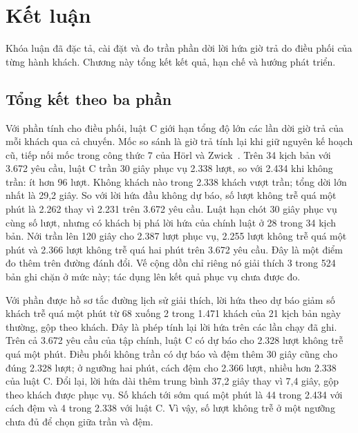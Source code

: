 \chapter{Kết luận}
\label{chuong:ketluan}

Khóa luận đã đặc tả, cài đặt và đo trần phần dời lời hứa giờ trả do điều phối của từng hành khách. Chương này tổng kết kết quả, hạn chế và hướng phát triển.

\section{Tổng kết theo ba phần}
\label{muc:c5-tongket}

Với phần tính cho điều phối, luật C giới hạn tổng độ lớn các lần dời giờ trả của mỗi khách qua cả chuyến. Mốc so sánh là giờ trả tính lại khi giữ nguyên kế hoạch cũ, tiếp nối mốc trong công thức 7 của Hörl và Zwick~\cite{horl2022}. Trên 34 kịch bản với 3.672 yêu cầu, luật C trần 30 giây phục vụ 2.338 lượt, so với 2.434 khi không trần: ít hơn 96 lượt. Không khách nào trong 2.338 khách vượt trần; tổng dời lớn nhất là 29,2 giây. So với lời hứa đầu không dự báo, số lượt không trễ quá một phút là 2.262 thay vì 2.231 trên 3.672 yêu cầu. Luật hạn chót 30 giây phục vụ cùng số lượt, nhưng có khách bị phá lời hứa của chính luật ở 28 trong 34 kịch bản. Nới trần lên 120 giây cho 2.387 lượt phục vụ, 2.255 lượt không trễ quá một phút và 2.366 lượt không trễ quá hai phút trên 3.672 yêu cầu. Đây là một điểm đo thêm trên đường đánh đổi. Vế cộng dồn chỉ riêng nó giải thích 3 trong 524 bản ghi chặn ở mức này; tác dụng lên kết quả phục vụ chưa được đo.

Với phần được hồ sơ tắc đường lịch sử giải thích, lời hứa theo dự báo giảm số khách trễ quá một phút từ 68 xuống 2 trong 1.471 khách của 21 kịch bản ngày thường, gộp theo khách. Đây là phép tính lại lời hứa trên các lần chạy đã ghi. Trên cả 3.672 yêu cầu của tập chính, luật C có dự báo cho 2.328 lượt không trễ quá một phút. Điều phối không trần có dự báo và đệm thêm 30 giây cũng cho đúng 2.328 lượt; ở ngưỡng hai phút, cách đệm cho 2.366 lượt, nhiều hơn 2.338 của luật C. Đổi lại, lời hứa dài thêm trung bình 37,2 giây thay vì 7,4 giây, gộp theo khách được phục vụ. Số khách tới sớm quá một phút là 44 trong 2.434 với cách đệm và 4 trong 2.338 với luật C. Vì vậy, số lượt không trễ ở một ngưỡng chưa đủ để chọn giữa trần và đệm.


